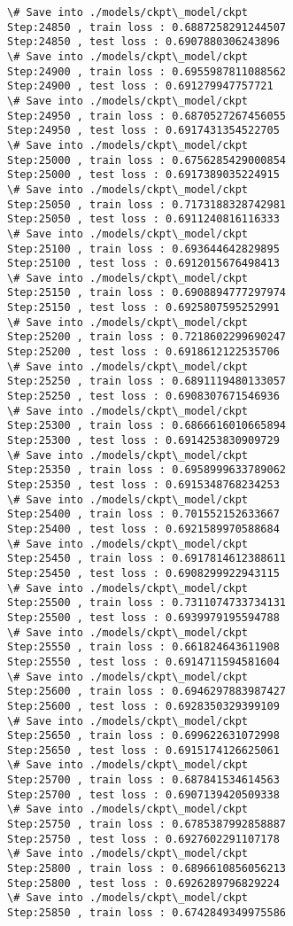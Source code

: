 \documentclass[11pt]{article}
\begin{document}
\begin{Verbatim}[commandchars=\\\{\}]
\# Save into ./models/ckpt\_model/ckpt
Step:24850 , train loss : 0.6887258291244507
Step:24850 , test loss : 0.6907880306243896
\# Save into ./models/ckpt\_model/ckpt
Step:24900 , train loss : 0.6955987811088562
Step:24900 , test loss : 0.691279947757721
\# Save into ./models/ckpt\_model/ckpt
Step:24950 , train loss : 0.6870527267456055
Step:24950 , test loss : 0.6917431354522705
\# Save into ./models/ckpt\_model/ckpt
Step:25000 , train loss : 0.6756285429000854
Step:25000 , test loss : 0.6917389035224915
\# Save into ./models/ckpt\_model/ckpt
Step:25050 , train loss : 0.7173188328742981
Step:25050 , test loss : 0.6911240816116333
\# Save into ./models/ckpt\_model/ckpt
Step:25100 , train loss : 0.693644642829895
Step:25100 , test loss : 0.6912015676498413
\# Save into ./models/ckpt\_model/ckpt
Step:25150 , train loss : 0.6908894777297974
Step:25150 , test loss : 0.6925807595252991
\# Save into ./models/ckpt\_model/ckpt
Step:25200 , train loss : 0.7218602299690247
Step:25200 , test loss : 0.6918612122535706
\# Save into ./models/ckpt\_model/ckpt
Step:25250 , train loss : 0.6891119480133057
Step:25250 , test loss : 0.6908307671546936
\# Save into ./models/ckpt\_model/ckpt
Step:25300 , train loss : 0.6866616010665894
Step:25300 , test loss : 0.6914253830909729
\# Save into ./models/ckpt\_model/ckpt
Step:25350 , train loss : 0.6958999633789062
Step:25350 , test loss : 0.6915348768234253
\# Save into ./models/ckpt\_model/ckpt
Step:25400 , train loss : 0.701552152633667
Step:25400 , test loss : 0.6921589970588684
\# Save into ./models/ckpt\_model/ckpt
Step:25450 , train loss : 0.6917814612388611
Step:25450 , test loss : 0.6908299922943115
\# Save into ./models/ckpt\_model/ckpt
Step:25500 , train loss : 0.7311074733734131
Step:25500 , test loss : 0.6939979195594788
\# Save into ./models/ckpt\_model/ckpt
Step:25550 , train loss : 0.661824643611908
Step:25550 , test loss : 0.6914711594581604
\# Save into ./models/ckpt\_model/ckpt
Step:25600 , train loss : 0.6946297883987427
Step:25600 , test loss : 0.6928350329399109
\# Save into ./models/ckpt\_model/ckpt
Step:25650 , train loss : 0.699622631072998
Step:25650 , test loss : 0.6915174126625061
\# Save into ./models/ckpt\_model/ckpt
Step:25700 , train loss : 0.687841534614563
Step:25700 , test loss : 0.6907139420509338
\# Save into ./models/ckpt\_model/ckpt
Step:25750 , train loss : 0.6785387992858887
Step:25750 , test loss : 0.6927602291107178
\# Save into ./models/ckpt\_model/ckpt
Step:25800 , train loss : 0.6896610856056213
Step:25800 , test loss : 0.6926289796829224
\# Save into ./models/ckpt\_model/ckpt
Step:25850 , train loss : 0.6742849349975586

\end{Verbatim}
\end{document}
